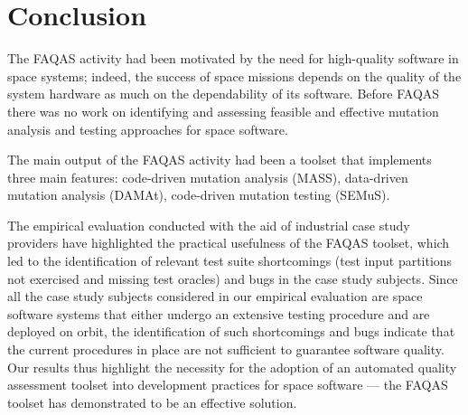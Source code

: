 
\section{Conclusion}
\label{sec:conclusion}

The FAQAS activity had been motivated by the need for high-quality software in space systems; indeed, the success of space missions depends on the quality of the system hardware as much on the dependability of its software. Before FAQAS there was no work on identifying and assessing feasible and effective mutation analysis and testing approaches for space software. 

The main output of the FAQAS activity had been a toolset that implements three main features: code-driven mutation analysis (MASS), data-driven mutation analysis (DAMAt), code-driven mutation testing (SEMuS).

The empirical evaluation conducted with the aid of industrial case study providers have highlighted the practical usefulness of the FAQAS toolset, which led to the identification of relevant test suite shortcomings (test input partitions not exercised and missing test oracles) and bugs in the case study subjects. 
Since all the case study subjects considered in our empirical evaluation are space software systems that either undergo an extensive testing procedure and are deployed on orbit, the identification of such shortcomings and bugs indicate that the current procedures in place are not sufficient to guarantee software quality.
Our results thus highlight the necessity for the adoption of an automated quality assessment toolset into development practices for space software --- the FAQAS toolset has demonstrated to be an effective solution.